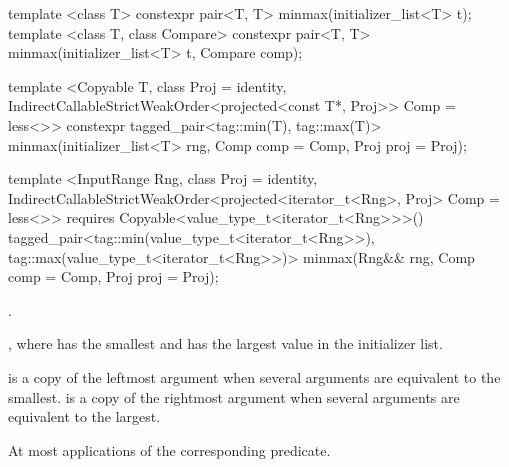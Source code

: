 %
\begin{removedblock}
\begin{itemdecl}
template <class T>
  constexpr pair<T, T> minmax(initializer_list<T> t);
template <class T, class Compare>
  constexpr pair<T, T> minmax(initializer_list<T> t, Compare comp);
\end{itemdecl}
\end{removedblock}
\begin{addedblock}
\begin{itemdecl}
template <Copyable T, class Proj = identity,
    IndirectCallableStrictWeakOrder<projected<const T*, Proj>> Comp = less<>>
  constexpr tagged_pair<tag::min(T), tag::max(T)>
    minmax(initializer_list<T> rng, Comp comp = Comp{}, Proj proj = Proj{});

template <InputRange Rng, class Proj = identity,
    IndirectCallableStrictWeakOrder<projected<iterator_t<Rng>, Proj> Comp = less<>>
  requires Copyable<value_type_t<iterator_t<Rng>>>()
  tagged_pair<tag::min(value_type_t<iterator_t<Rng>>),
              tag::max(value_type_t<iterator_t<Rng>>)>
    minmax(Rng&& rng, Comp comp = Comp{}, Proj proj = Proj{});
\end{itemdecl}
\end{addedblock}

\begin{itemdescr}
\pnum
\requires {}.

\pnum
\returns {}, where  has the smallest and  has the
largest value in the initializer list.

\pnum
\remarks {} is a copy of the leftmost argument when several arguments are equivalent to
the smallest.  is a copy of the rightmost argument when several arguments are
equivalent to the largest.

\pnum
\complexity At most 
applications of the corresponding predicate.
\end{itemdescr}

